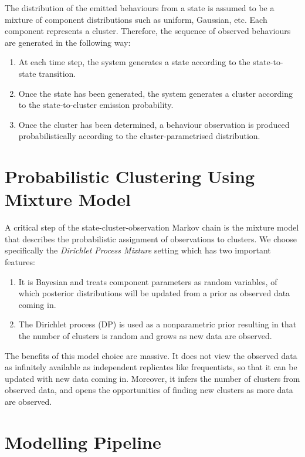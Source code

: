 \documentclass[english,a4,oneside,9pt]{extarticle}
\begin{document}
The distribution of the emitted behaviours from a state is assumed to be a mixture of component distributions such as uniform, Gaussian, etc. Each component represents a cluster. Therefore, the sequence of observed behaviours are generated in the following way:
\begin{enumerate}
\item At each time step, the system generates a state according to the state-to-state transition.
\item Once the state has been generated, the system generates a cluster according to the state-to-cluster emission probability.
\item Once the cluster has been determined, a behaviour observation is produced probabilistically according to the cluster-parametrised distribution.
\end{enumerate}

\section{Probabilistic Clustering Using Mixture Model}


A critical step of the state-cluster-observation Markov chain is the mixture model that describes the probabilistic assignment of observations to clusters. We choose specifically the \textit{Dirichlet Process Mixture} setting which has two important features:
\begin{enumerate}
\item It is Bayesian and treats component parameters as random variables, of which posterior distributions will be updated from a prior as observed data coming in. 
\item The Dirichlet process (DP) is used as a nonparametric prior resulting in that the number of clusters is random and grows as new data are observed.
\end{enumerate}
The benefits of this model choice are massive. It does not view the observed data as infinitely available as independent replicates like frequentists, so that it can be updated with new data coming in. Moreover, it infers the number of clusters from observed data, and opens the opportunities of finding new clusters as more data are observed.

\section{Modelling Pipeline}
\end{document}
